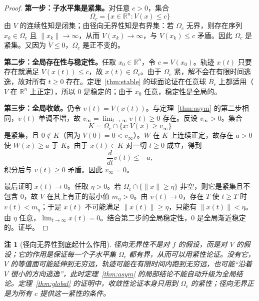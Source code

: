 \documentclass[11pt, a4paper, UTF8, fontset=none]{ctexart}
\theoremstyle{cnthm}
\newtheorem{remark}{注}[section]
\newcommand{\R}{\mathbb{R}}
\newcommand{\norm}[1]{\lVert #1\rVert}
\begin{document}
\begin{proof}
\textbf{第一步：子水平集是紧集。}对任意 $c>0$，集合
\begin{equation}
  \Omega_c=\{x\in\R^n:V(x)\le c\}
\end{equation}
由 $V$ 的连续性知是闭集；由径向无界性知是有界集：若 $\Omega_c$ 无界，则存在序列 $x_k\in\Omega_c$ 且 $\norm{x_k}\to\infty$，从而 $V(x_k)\to\infty$，与 $V(x_k)\le c$ 矛盾。因此 $\Omega_c$ 是紧集。又因为 $\dot V\le0$，$\Omega_c$ 是正不变的。

\textbf{第二步：全局存在性与稳定性。}任取 $x_0\in\R^n$，令 $c=V(x_0)$。轨迹 $x(t)$ 只要存在就满足 $V(x(t))\le c$，故 $x(t)\in\Omega_c$。由于 $\Omega_c$ 紧，解不会在有限时间逃逸，故对所有 $t\ge0$ 存在。定理~\ref{thm:stable} 的球面论证在任意球 $\bar B_r$ 上都适用（$V$ 在 $\R^n$ 上正定），所以 $0$ 是稳定的；由于 $x_0$ 任意，稳定性是全局的。

\textbf{第三步：全局收敛。}仍令 $v(t)=V(x(t))$。与定理~\ref{thm:asym} 的第二步相同，$v(t)$ 单调不增，故 $v_\infty=\lim_{t\to\infty}v(t)\ge0$ 存在。反设 $v_\infty>0$。集合
\begin{equation}
  K=\Omega_c\cap\{x:V(x)\ge v_\infty\}
\end{equation}
是紧集，且 $0\notin K$（因为 $V(0)=0<v_\infty$）。$W$ 在 $K$ 上连续正定，故存在 $a>0$ 使 $W(x)\ge a$ 于 $K$。由于 $x(t)\in K$ 对一切 $t\ge0$ 成立，得到
\begin{equation}
  \frac{d}{dt}v(t)\le -a,
\end{equation}
积分后与 $v(t)\ge0$ 矛盾。因此 $v_\infty=0$。

最后证明 $x(t)\to0$。任取 $\eta>0$。若 $\Omega_c\cap\{\norm{x}\ge\eta\}$ 非空，则它是紧集且不包含 $0$，故 $V$ 在其上有正的最小值 $m_\eta>0$。由 $v(t)\to0$，存在 $T$ 使 $t\ge T$ 时 $v(t)<m_\eta$；于是 $x(t)$ 不可能满足 $\norm{x(t)}\ge\eta$，只能有 $\norm{x(t)}<\eta$。由 $\eta$ 任意，$\lim_{t\to\infty}x(t)=0$。结合第二步的全局稳定性，$0$ 是全局渐近稳定的。证毕。
\end{proof}

\begin{remark}[径向无界性到底起什么作用]
径向无界性不是对 $f$ 的假设，而是对 $V$ 的假设；它的作用是保证每一个子水平集 $\Omega_c$ 都有界，从而可以用紧性论证。没有它，$V$ 的等值面可能延伸到无穷远，轨迹可能在有限时间内跑到无穷远，也可能“沿着 $V$ 很小的方向逃逸”，此时定理~\ref{thm:asym} 的局部结论不能自动升级为全局结论。定理~\ref{thm:global} 的证明中，收敛性论证本身只用到 $\Omega_c$ 的紧性；径向无界正是为所有 $c$ 提供这一紧性的条件。
\end{remark}
\end{document}
